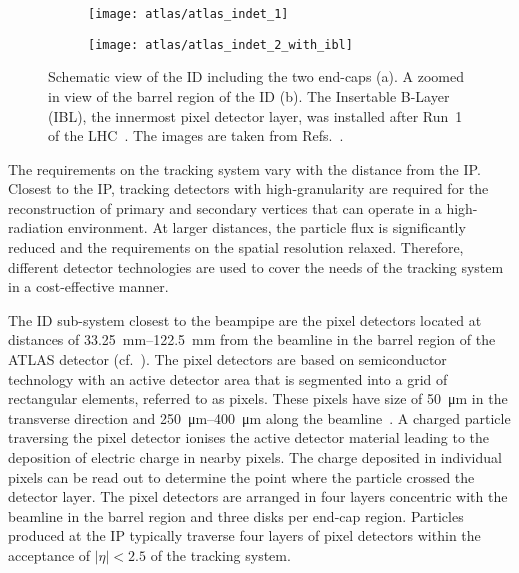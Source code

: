 \begin{figure}[htbp]

  \begin{subfigure}[b]{0.55\textwidth}
    \texttt{[image: atlas/atlas\_indet\_1]}%
    \subcaption{}
  \end{subfigure}\hfill%
  \begin{subfigure}[b]{0.45\textwidth}
    \texttt{[image: atlas/atlas\_indet\_2\_with\_ibl]}%
    \subcaption{}%
    \label{fig:indet_barrel}
  \end{subfigure}

  \caption[Overview of the ATLAS inner detector.]{Schematic view of the ID
    including the two end-caps (a). A zoomed in view of the barrel region of the
    ID (b). The Insertable B-Layer (IBL), the innermost pixel detector layer,
    was installed after Run~1 of the LHC~\cite{ATLAS-TDR-19,PIX-2018-001}. The
    images are taken from Refs.~\cite{PERF-2007-01,IDTR-2019-05}.}%
  \label{fig:atlas_inner_detector}
\end{figure}

The requirements on the tracking system vary with the distance from the IP.
Closest to the IP, tracking detectors with high-granularity are required for the
reconstruction of primary and secondary vertices that can operate in a
high-radiation environment. At larger distances, the particle flux is
significantly reduced and the requirements on the spatial resolution relaxed.
Therefore, different detector technologies are used to cover the needs of the
tracking system in a cost-effective manner.

The ID sub-system closest to the beampipe are the pixel detectors located at
distances of \SIrange{33.25}{122.5}{\milli\metre} from the beamline in the
barrel region of the ATLAS detector (cf.\ ). The
pixel detectors are based on semiconductor technology with an active detector
area that is segmented into a grid of rectangular elements, referred to as
pixels. These pixels have size of \SI{50}{\micro\metre} in the transverse
direction and \SIrange{250}{400}{\micro\metre} along the
beamline~\cite{PERF-2007-01,PIX-2018-001}. A charged particle traversing the
pixel detector ionises the active detector material leading to the deposition of
electric charge in nearby pixels. The charge deposited in individual pixels can
be read out to determine the point where the particle crossed the detector
layer. The pixel detectors are arranged in four layers concentric with the
beamline in the barrel region and three disks per end-cap region. Particles
produced at the IP typically traverse four layers of pixel detectors within the
acceptance of $|\eta| < 2.5$ of the tracking system.

